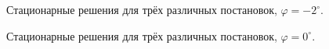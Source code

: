 \documentclass[14pt, a4paper, fleqn]{extarticle}
\begin{document}
\begin{figure}[H]
\caption{Стационарные решения для трёх различных постановок, $\varphi = -2^\circ$.}
\end{figure}

\begin{figure}[H]
\caption{Стационарные решения для трёх различных постановок, $\varphi = 0^\circ$.}
\end{figure}
\end{document}

